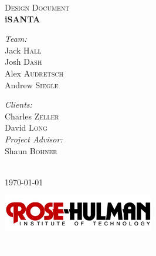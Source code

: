 \documentclass[11pt]{article}
\begin{document}
\begin{titlepage}
\begin{center}
\textsc{\Large Design Document}\\[0.5cm]
{ \Huge \bfseries iSANTA}\\[0.4cm]

\begin{minipage}{0.4\textwidth}
\begin{flushleft} \large
\emph{Team:}\\
Jack \textsc{Hall}\\
Josh \textsc{Dash}\\
Alex \textsc{Audretsch}\\
Andrew \textsc{Siegle}\\
\end{flushleft}
\end{minipage}
\begin{minipage}{0.4\textwidth}
\begin{flushright} \large
\emph{Clients:} \\
Charles \textsc{Zeller}\\
David \textsc{Long}\\
\emph{Project Advisor:}\\
Shaun \textsc{Bohner}
\end{flushright}
\end{minipage}
\\[1cm]
{\large \today}

\begin{center}
\includegraphics[scale = 4, angle = 0]{Rose-HulmanLogo.png}
\end{center}
\textcolor{white}{.}%
\\[3cm]

\end{center}

\end{titlepage}
\end{document}
